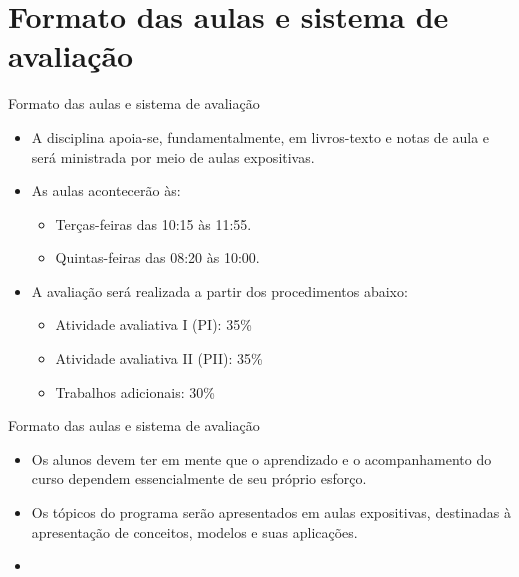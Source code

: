 \documentclass[10pt]{beamer}
\begin{document}
\section{Formato das aulas e sistema de avaliação}
\begin{frame}{Formato das aulas e sistema de avaliação}
    \begin{itemize}
        \item A disciplina apoia-se, fundamentalmente, em livros-texto e notas de aula e será ministrada por meio de aulas expositivas.\bigskip

        \item As aulas acontecerão às:\medskip
              \begin{itemize}
                  \item Terças-feiras das 10:15 às 11:55.\medskip
                  \item Quintas-feiras das 08:20 às 10:00.\bigskip
              \end{itemize}

        \item A avaliação será realizada a partir dos procedimentos abaixo:\medskip
              \begin{itemize}
                  \item Atividade avaliativa I (PI): 35\%\medskip
                  \item Atividade avaliativa II (PII): 35\%\medskip                  
                  \item Trabalhos adicionais: 30\%
              \end{itemize}
    \end{itemize}
\end{frame}

\begin{frame}{Formato das aulas e sistema de avaliação}
    \begin{itemize}
        \item Os alunos devem ter em mente que o aprendizado e o acompanhamento do curso dependem essencialmente de seu próprio esforço.\bigskip

        \item Os tópicos do programa serão apresentados em aulas expositivas, destinadas à apresentação de conceitos, modelos e suas aplicações.\bigskip

        \item[\emoji{warning}] 
    \end{itemize}
\end{frame}
\end{document}
